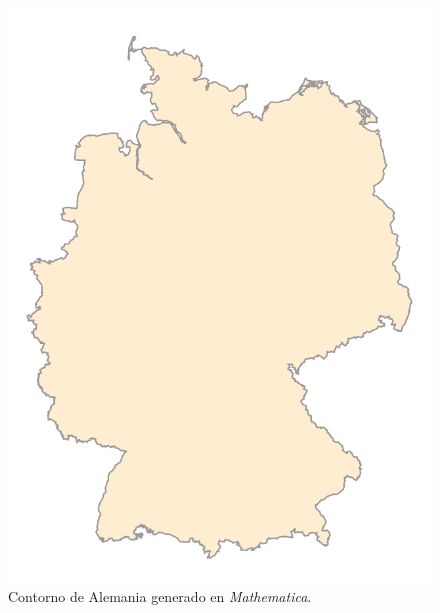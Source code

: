 \begin{multicols}{2}
\begin{figure}[H]
	\centering
	\includegraphics[scale=0.25]{./img/germany.pdf}
	\caption{Contorno de Alemania generado en \textit{Mathematica}.}
\end{figure}


\end{multicols}





























